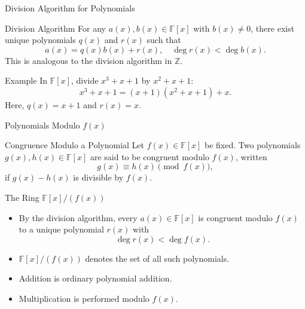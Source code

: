 \documentclass[aspectratio=169,xcolor=dvipsnames]{beamer}
\begin{document}
	\begin{frame}{Division Algorithm for Polynomials}
		
		\begin{block}{Division Algorithm}
			For any $a(x), b(x) \in \mathbb{F}[x]$ with $b(x) \neq 0$, there exist
			unique polynomials $q(x)$ and $r(x)$ such that
			\[
			a(x) = q(x)b(x) + r(x),
			\quad \deg r(x) < \deg b(x).
			\]
			This is analogous to the division algorithm in $\mathbb{Z}$.
		\end{block}
		
		\vspace{0.4em}
		
		\begin{alertblock}{Example}
			In $\mathbb{F}[x]$, divide $x^3 + x + 1$ by $x^2 + x + 1$:
			\[
			x^3 + x + 1 = (x + 1)(x^2 + x + 1) + x.
			\]
			Here, $q(x) = x + 1$ and $r(x) = x$.
		\end{alertblock}
		
	\end{frame}
	
	\begin{frame}{Polynomials Modulo $f(x)$}
		
		\begin{block}{Congruence Modulo a Polynomial}
			Let $f(x) \in \mathbb{F}[x]$ be fixed.  
			Two polynomials $g(x), h(x) \in \mathbb{F}[x]$ are said to be
			\alert{congruent modulo $f(x)$}, written
			\[
			g(x) \equiv h(x) \pmod{f(x)},
			\]
			if $g(x) - h(x)$ is divisible by $f(x)$.
		\end{block}
		
		\vspace{0.4em}
		
		\begin{block}{The Ring $\mathbb{F}[x]/(f(x))$}
			\begin{itemize}
				\item By the division algorithm, every $a(x) \in \mathbb{F}[x]$ is congruent
				modulo $f(x)$ to a unique polynomial $r(x)$ with
				\[
				\deg r(x) < \deg f(x).
				\]
				\item $\mathbb{F}[x]/(f(x))$ denotes the set of all such polynomials.
				\item Addition is ordinary polynomial addition.
				\item Multiplication is performed modulo $f(x)$.
			\end{itemize}
		\end{block}
		
	\end{frame}
	
\end{document}
